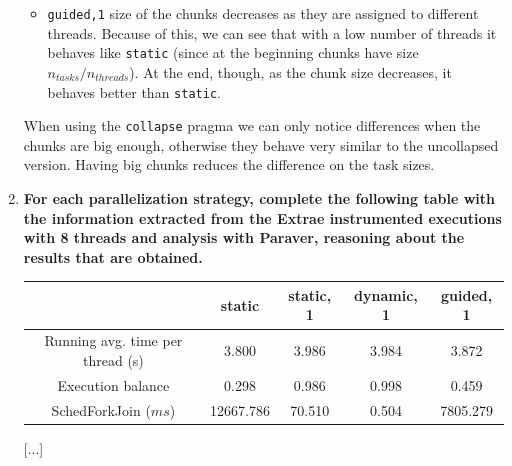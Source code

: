 \documentclass[a4paper,11pt]{article}
\begin{document}
\begin{enumerate}
\begin{itemize}
\item \texttt{guided,1} size of the chunks decreases as they are
  assigned to different threads. Because of this, we can see that with
  a low number of threads it behaves like \texttt{static} (since at
  the beginning chunks have size ${n_{tasks}}/{n_{threads}}$). At the
  end, though, as the chunk size decreases, it behaves better than
  \texttt{static}.

\end{itemize}

When using the \texttt{collapse} pragma we can only notice differences when the chunks
are big enough, otherwise they behave very similar to the uncollapsed version.
Having big chunks reduces the difference on the task sizes.

\newpage
\setcounter{enumi}{4}
\item
\textbf{For each parallelization strategy, complete the following table with the information extracted from
    the Extrae instrumented executions with 8 threads and analysis with Paraver, reasoning about the
    results that are obtained.}
\begin{center}
\begin{tabular}{| c || c | c | c | c |}
\hline
\textbf{} & \textbf{static} & \textbf{static, 1} & \textbf{dynamic, 1} & \textbf{guided, 1}
\\
\hline
\hline
Running avg. time per thread (s) & 3.800 & 3.986 & 3.984 & 3.872
\\
\hline
Execution balance & 0.298 & 0.986 & 0.998 & 0.459
\\
\hline
SchedForkJoin ($ms$) & 12667.786 & 70.510 & 0.504 & 7805.279
\\
\hline
\end{tabular}
\end{center}
[...]
\end{enumerate}
\end{document}

